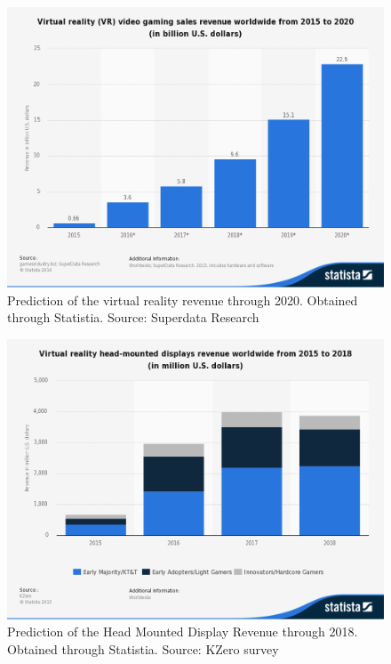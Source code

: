 \documentclass[a4paper,10pt]{article}
\begin{document}
\begin{figure}[H]
	\centerline{\includegraphics[scale = 0.3]{statMon2.png}}
	\caption{Prediction of the virtual reality revenue through 2020.  Obtained through Statistia.  Source: Superdata Research \cite{vrRev}}
	\label{fig:virRevenue}
\end{figure}

\begin{figure}[H]
	\centerline{\includegraphics[scale = 0.3]{statMon.png}}
	\caption{Prediction of the Head Mounted Display Revenue through 2018.  Obtained through Statistia.  Source: KZero survey \cite{hmdRev}}
	\label{fig:moneyStats}
\end{figure}
\end{document}
